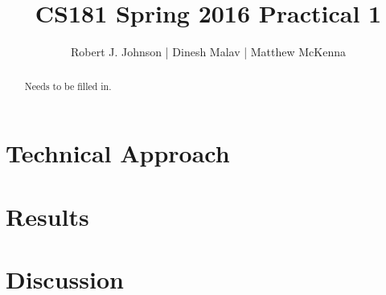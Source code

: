 \documentclass{article}
\begin{document}
\title{CS181 Spring 2016 Practical 1}
\author{Robert J. Johnson | Dinesh Malav | Matthew McKenna}


\maketitle

\begin{abstract}
Needs to be filled in. 
\end{abstract}

\section{Technical Approach}

\section{Results}

\section{Discussion}
\end{document}
